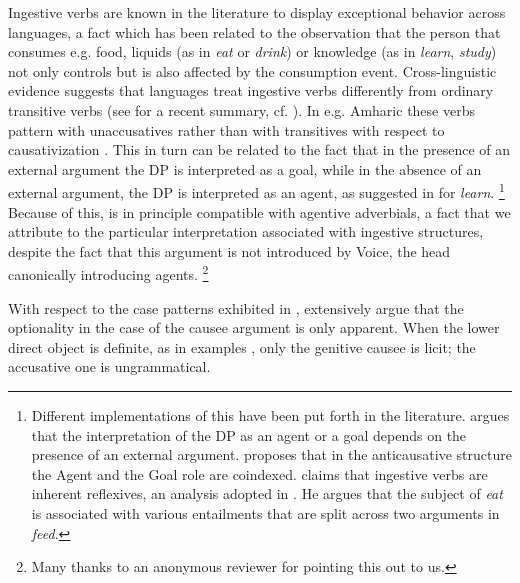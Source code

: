 \documentclass[output=paper]{langscibook}
\begin{document}
Ingestive verbs are known in the literature to display exceptional behavior across languages, 
a fact which has been related to the observation that the person 
that consumes e.g. food, liquids (as in \textit{eat} or \textit{drink}) or knowledge (as in \textit{learn}, \textit{study})
not only controls but is also affected by the consumption event. 
Cross-linguistic evidence suggests that languages treat ingestive verbs differently from ordinary transitive verbs 
(see \citealt{Jerro2019} for a recent summary, cf. \citealt{Amberber1996,Jackendoff1990}). 
In e.g. Amharic these verbs pattern with unaccusatives rather than with transitives with respect to causativization \citep{Amberber1996}. 
This in turn can be related to the fact that in the presence of an external argument the DP is interpreted as a goal, 
while in the absence of an external argument, the DP is interpreted as an agent, as suggested in \citet{Anagnostopoulou2001} for \textit{learn}.%
\footnote{Different implementations of this have been put forth in the literature. \citet{Anagnostopoulou2001} argues that the interpretation of the DP as an agent or a goal depends on the presence of an external argument. 
    \citet{Amberber1996} proposes that in the anticausative structure the Agent and the Goal role are coindexed. 
    \citet{Krejci2012} claims that ingestive verbs are inherent reflexives, an analysis adopted in \citet{Jerro2019}. 
    He argues that the subject of \textit{eat} is associated with various entailments that are split across two arguments in \textit{feed}.}
Because of this,  is in principle compatible with agentive adverbials, 
a fact that we attribute to the particular interpretation associated with ingestive structures, 
despite the fact that this argument is not introduced by Voice, the head canonically introducing agents.%
\footnote{Many thanks to an anonymous reviewer for pointing this out to us.}

With respect to the case patterns exhibited in , 
\citet{AnagnostopoulouSevdali2020} extensively argue that the optionality in the case of the causee argument is only apparent. 
When the lower direct object is definite, as in examples , only the genitive causee is licit; 
the accusative one is ungrammatical. 

\ea
    \label{alexiadouex:key:10}
    \z 
\z
\end{document}
